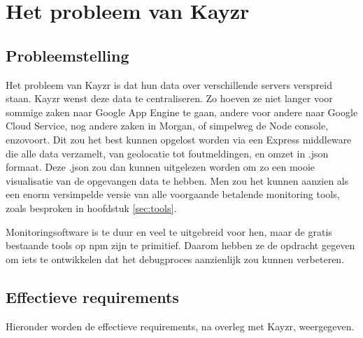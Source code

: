
\chapter{Het probleem van Kayzr}
\label{ch:kayzrsProblem}

\section{Probleemstelling}
\label{sec:problem}

Het probleem van Kayzr is dat hun data over verschillende servers verspreid staan. Kayzr wenst deze data te centraliseren. Zo hoeven ze niet langer voor sommige zaken naar Google App Engine te gaan, andere voor andere naar Google Cloud Service, nog andere zaken in Morgan, of simpelweg de Node console, enzovoort. Dit zou het best kunnen opgelost worden via een Express middleware die alle data verzamelt, van geolocatie tot foutmeldingen, en omzet in .json formaat. Deze .json zou dan kunnen uitgelezen worden om zo een mooie visualisatie van de opgevangen data te hebben. Men zou het kunnen aanzien als een enorm versimpelde versie van alle voorgaande betalende monitoring tools, zoals besproken in hoofdstuk \ref{sec:tools}. 

Monitoringsoftware is te duur en veel te uitgebreid voor hen, maar de gratis bestaande tools op npm zijn te primitief. Daarom hebben ze de opdracht gegeven om iets te ontwikkelen dat het debugproces aanzienlijk zou kunnen verbeteren. 

\section{Effectieve requirements}
\label{sec:requirements}

Hieronder worden de effectieve requirements, na overleg met Kayzr, weergegeven.

